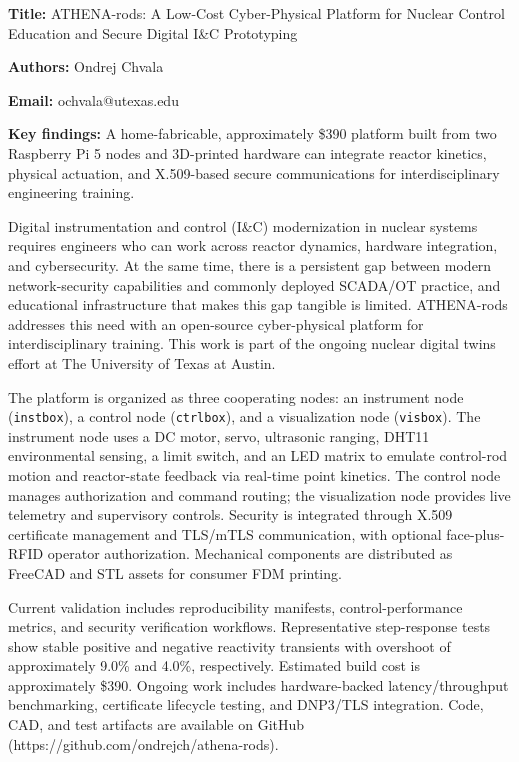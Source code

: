 \documentclass[11pt]{article}
\begin{document}
\textbf{Title:} ATHENA-rods: A Low-Cost Cyber-Physical Platform for Nuclear Control Education and Secure Digital I\&C Prototyping

\textbf{Authors:} Ondrej Chvala

\textbf{Email:} ochvala@utexas.edu

\textbf{Key findings:} A home-fabricable, approximately \$390 platform built from two Raspberry Pi 5 nodes and 3D-printed hardware can integrate reactor kinetics, physical actuation, and X.509-based secure communications for interdisciplinary engineering training.

Digital instrumentation and control (I\&C) modernization in nuclear systems requires engineers who can work across reactor dynamics, hardware integration, and cybersecurity. At the same time, there is a persistent gap between modern network-security capabilities and commonly deployed SCADA/OT practice, and educational infrastructure that makes this gap tangible is limited. ATHENA-rods addresses this need with an open-source cyber-physical platform for interdisciplinary training. This work is part of the ongoing nuclear digital twins effort at The University of Texas at Austin.

The platform is organized as three cooperating nodes: an instrument node (\texttt{instbox}), a control node (\texttt{ctrlbox}), and a visualization node (\texttt{visbox}). The instrument node uses a DC motor, servo, ultrasonic ranging, DHT11 environmental sensing, a limit switch, and an LED matrix to emulate control-rod motion and reactor-state feedback via real-time point kinetics. The control node manages authorization and command routing; the visualization node provides live telemetry and supervisory controls. Security is integrated through X.509 certificate management and TLS/mTLS communication, with optional face-plus-RFID operator authorization. Mechanical components are distributed as FreeCAD and STL assets for consumer FDM printing.

Current validation includes reproducibility manifests, control-performance metrics, and security verification workflows. Representative step-response tests show stable positive and negative reactivity transients with overshoot of approximately 9.0\% and 4.0\%, respectively. Estimated build cost is approximately \$390. Ongoing work includes hardware-backed latency/throughput benchmarking, certificate lifecycle testing, and DNP3/TLS integration. Code, CAD, and test artifacts are available on GitHub (https://github.com/ondrejch/athena-rods).
\end{document}
